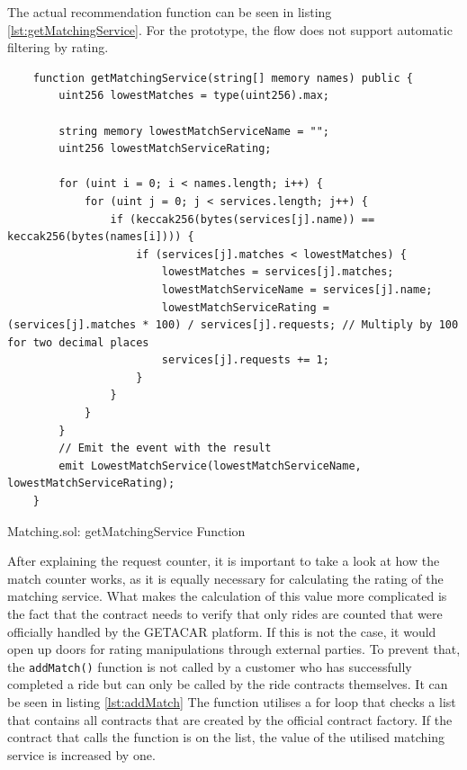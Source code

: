 The actual recommendation function can be seen in listing \ref{lst:getMatchingService}. For the prototype, the flow does not support automatic filtering by rating.

\lstset{
  basicstyle=\footnotesize\ttfamily,
  breaklines=true,
  numbers=left,
  firstnumber=59
}

\begin{Listing}
\begin{lstlisting}
    function getMatchingService(string[] memory names) public {
        uint256 lowestMatches = type(uint256).max;

        string memory lowestMatchServiceName = "";
        uint256 lowestMatchServiceRating;

        for (uint i = 0; i < names.length; i++) {
            for (uint j = 0; j < services.length; j++) {
                if (keccak256(bytes(services[j].name)) == keccak256(bytes(names[i]))) {
                    if (services[j].matches < lowestMatches) {
                        lowestMatches = services[j].matches;
                        lowestMatchServiceName = services[j].name;
                        lowestMatchServiceRating = (services[j].matches * 100) / services[j].requests; // Multiply by 100 for two decimal places
                        services[j].requests += 1;
                    }
                }
            }
        }
        // Emit the event with the result
        emit LowestMatchService(lowestMatchServiceName, lowestMatchServiceRating);
    }
\end{lstlisting}
  \caption{Matching.sol: getMatchingService Function}
  \label{lst:getMatchingService}
\end{Listing}

After explaining the request counter, it is important to take a look at how the match counter works, as it is equally necessary for calculating the rating of the matching service. What makes the calculation of this value more complicated is the fact that the contract needs to verify that only rides are counted that were officially handled by the GETACAR platform. If this is not the case, it would open up doors for rating manipulations through external parties. To prevent that, the \texttt{addMatch()} function is not called by a customer who has successfully completed a ride but can only be called by the ride contracts themselves. It can be seen in listing \ref{lst:addMatch} The function utilises a for loop that checks a list that contains all contracts that are created by the official contract factory. If the contract that calls the function is on the list, the value of the utilised matching service is increased by one.

